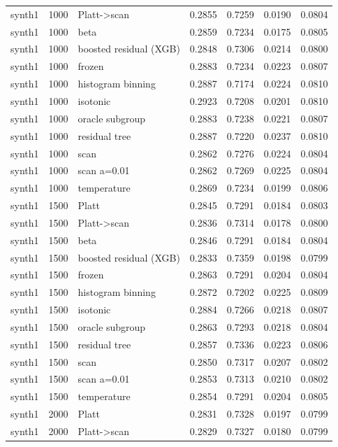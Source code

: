 \begin{tabular}{lllrrrr}
synth1 & 1000 & Platt->scan & 0.2855 & 0.7259 & 0.0190 & 0.0804 \\
synth1 & 1000 & beta & 0.2859 & 0.7234 & 0.0175 & 0.0805 \\
synth1 & 1000 & boosted residual (XGB) & 0.2848 & 0.7306 & 0.0214 & 0.0800 \\
synth1 & 1000 & frozen & 0.2883 & 0.7234 & 0.0223 & 0.0807 \\
synth1 & 1000 & histogram binning & 0.2887 & 0.7174 & 0.0224 & 0.0810 \\
synth1 & 1000 & isotonic & 0.2923 & 0.7208 & 0.0201 & 0.0810 \\
synth1 & 1000 & oracle subgroup & 0.2883 & 0.7238 & 0.0221 & 0.0807 \\
synth1 & 1000 & residual tree & 0.2887 & 0.7220 & 0.0237 & 0.0810 \\
synth1 & 1000 & scan & 0.2862 & 0.7276 & 0.0224 & 0.0804 \\
synth1 & 1000 & scan a=0.01 & 0.2862 & 0.7269 & 0.0225 & 0.0804 \\
synth1 & 1000 & temperature & 0.2869 & 0.7234 & 0.0199 & 0.0806 \\
synth1 & 1500 & Platt & 0.2845 & 0.7291 & 0.0184 & 0.0803 \\
synth1 & 1500 & Platt->scan & 0.2836 & 0.7314 & 0.0178 & 0.0800 \\
synth1 & 1500 & beta & 0.2846 & 0.7291 & 0.0184 & 0.0804 \\
synth1 & 1500 & boosted residual (XGB) & 0.2833 & 0.7359 & 0.0198 & 0.0799 \\
synth1 & 1500 & frozen & 0.2863 & 0.7291 & 0.0204 & 0.0804 \\
synth1 & 1500 & histogram binning & 0.2872 & 0.7202 & 0.0225 & 0.0809 \\
synth1 & 1500 & isotonic & 0.2884 & 0.7266 & 0.0218 & 0.0807 \\
synth1 & 1500 & oracle subgroup & 0.2863 & 0.7293 & 0.0218 & 0.0804 \\
synth1 & 1500 & residual tree & 0.2857 & 0.7336 & 0.0223 & 0.0806 \\
synth1 & 1500 & scan & 0.2850 & 0.7317 & 0.0207 & 0.0802 \\
synth1 & 1500 & scan a=0.01 & 0.2853 & 0.7313 & 0.0210 & 0.0802 \\
synth1 & 1500 & temperature & 0.2854 & 0.7291 & 0.0204 & 0.0805 \\
synth1 & 2000 & Platt & 0.2831 & 0.7328 & 0.0197 & 0.0799 \\
synth1 & 2000 & Platt->scan & 0.2829 & 0.7327 & 0.0180 & 0.0799 \\

\end{tabular}
